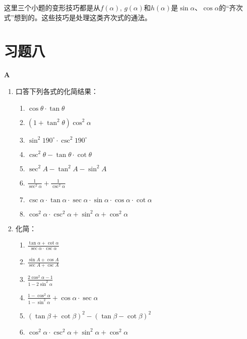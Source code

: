 \begin{remark}
这里三个小题的变形技巧都是从$f(\alpha)$, $g(\alpha)$和$h(\alpha)$是$\sin\alpha$、$\cos\alpha$的“齐次式”想到的。这些技巧是处理这类齐次式的通法。
\end{remark}

\section*{习题八}
\begin{center}
    \bfseries A
\end{center}

\begin{enumerate}
\item 口答下列各式的化简结果：
\begin{multicols}{2}
\begin{enumerate}[(1)]
    \item $\cos\theta\cdot \tan\theta$
    \item $(1+\tan^2\theta)\cos^2\alpha$
    \item $\sin^2 190^{\circ}\cdot \csc^2 190^{\circ}$
    \item $\csc^2\theta-\tan\theta\cdot \cot \theta$
    \item $\sec^2 A-\tan^2A-\sin^2A$
    \item $\frac{1}{\sec^2\alpha}+\frac{1}{\csc^2\alpha}$
    \item $\csc\alpha\cdot \tan\alpha\cdot \sec\alpha\cdot \sin\alpha\cdot \cos \alpha \cdot \cot \alpha$
    \item $\cos^2\alpha\cdot \csc^2\alpha+\sin^2\alpha+\cos^2\alpha$
\end{enumerate}
\end{multicols}

\item 化简：
\begin{multicols}{2}
\begin{enumerate}[(1)]
    \item $\frac{\tan\alpha+\cot\alpha}{\sec\alpha\cdot \csc\alpha}$
    \item $\frac{\sin A+\cos A}{\sec A+\csc A}$
    \item $\frac{2\cos^2 \alpha-1}{1-2\sin^2\alpha}$
    \item $\frac{1-\cos^2\alpha}{1-\sin^2\alpha}+\cos\alpha\cdot \sec\alpha$
    \item $(\tan\beta+\cot\beta)^2-(\tan\beta-\cot\beta)^2$
    \item $\cos^2\alpha\cdot \csc^2\alpha+\sin^2\alpha+\cos^2\alpha$
\end{enumerate}
\end{multicols}


\end{enumerate}
